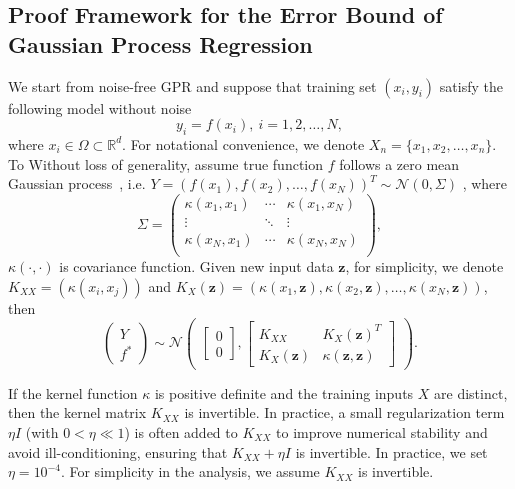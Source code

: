 \documentclass[preprint,review,sort&compress,3p]{elsarticle}
\begin{document}
\subsection{Proof Framework for the Error Bound of Gaussian Process Regression}
We start from noise-free GPR and suppose that training set $(x_i,y_i)$ satisfy the following model without noise
$$
y_i = f(x_i),~i = 1,2, \dots, N,
$$
where $x_i\in \Omega\subset\mathbb{R}^d$. For notational convenience, we denote $X_n = \{x_1,x_2,\dots,x_n\}$. To Without loss of generality, assume true function $f$ follows a zero mean Gaussian process~\cite{C-C-2006}, i.e. $Y = (f(x_1),f(x_2), \dots, f(x_N))^T \sim \mathcal{N}(0,\Sigma)$
, where
$$
\Sigma = 
\begin{pmatrix}
	\kappa(x_1,x_1) & \cdots & \kappa(x_1,x_N) \\
	\vdots			& \ddots & \vdots 	     \\
	\kappa(x_N,x_1) & \cdots & \kappa(x_N,x_N) \\
\end{pmatrix},
$$
$\kappa(\cdot,\cdot)$ is covariance function. 
Given new input data $\boldsymbol{z}$, for simplicity, we denote $K_{XX} = (\kappa(x_i,x_j))$ and $K_X(\boldsymbol{z}) = (\kappa(x_1,\boldsymbol{z}), \kappa(x_2,\boldsymbol{z}), \dots, \kappa(x_N,\boldsymbol{z}))$, then 
$$
\begin{pmatrix}
	Y\\f^*
\end{pmatrix}
\sim
\mathcal{N}\begin{pmatrix}
	\begin{bmatrix}
		0 \\ 0
	\end{bmatrix}, 
	\begin{bmatrix}
		K_{XX} & K_X(\boldsymbol{z})^T \\ K_X(\boldsymbol{z}) &\kappa(\boldsymbol{z},\boldsymbol{z})
	\end{bmatrix}
\end{pmatrix}. 
$$


{  If the kernel function $\kappa$ is positive definite and the training inputs $X$ are distinct, then the kernel matrix $K_{XX}$ is invertible. In practice, a small regularization term $\eta I$ (with $0<\eta\ll 1$) is often added to $K_{XX}$ to improve numerical stability and avoid ill-conditioning, ensuring that $K_{XX} + \eta I$ is invertible. In practice, we set $\eta = 10^{-4}$. For simplicity in the analysis, we assume $K_{XX}$ is invertible.
}
\end{document}
